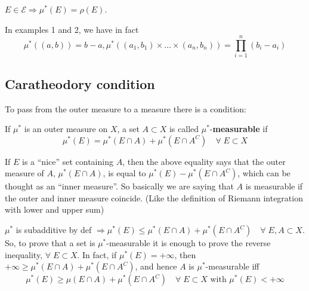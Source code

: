 \begin{remark}
    \(E \in \mathcal{E} \Rightarrow \mu^*(E) = \rho(E)\).  

    In examples 1 and 2, we have in fact 
    \[
        \mu^*((a,b)) = b-a, \mu^*\left((a_1, b_1) \times \ldots \times (a_n, b_n)\right) = \prod_{i=1}^{n} (b_i - a_i)
    \] 
\end{remark}
\subsection{Caratheodory condition}
To pass from the outer measure to a measure there is a condition: 
\begin{definition}
    If \(\mu^*\) is an outer measure on \(X\), a set \(A \subset X\) is called \(\mu^*\)-\textbf{measurable} if 
    \[
        \mu^*(E) = \mu^*(E \cap A) + \mu^*(E \cap A^C) \quad \forall \; E \subset X
    \]
\end{definition}
\begin{remark}
    If \(E\) is a ``nice'' set containing \(A\), then the above equality says that the outer measure of \(A\), \(\mu^*(E \cap A)\), is equal to \(\mu^*(E) - \mu^*(E \cap A^C)\), which can be thought as an ``inner measure''. So basically we are saying that \(A\) is measurable if the outer and inner measure coincide. (Like the definition of Riemann integration with lower and upper sum)
\end{remark}
\begin{remark}
    \(\mu^*\) is subadditive by def \(\Rightarrow \mu^*(E) \leq \mu^*(E \cap A) + \mu^*(E \cap A^C) \quad \forall \; E, A \subset X\).  
    So, to prove that a set is \(\mu^*\)-measurable it is enough to prove the reverse inequality, \(\forall \; E \subset X\). In fact, if \(\mu^*(E) = +\infty\), then \(+\infty \geq \mu^*(E \cap A) + \mu^*(E \cap A^C)\), and hence \(A\) is \(\mu^*\)-measurable iff 
    \[
        \mu^*(E) \geq \mu(E \cap A) + \mu^*(E \cap A^C) \quad \forall \; E \subset X \mbox{ with } \mu^*(E) < +\infty
    \] 
\end{remark}
